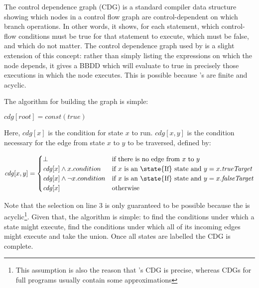 \label{sect:cdg}

The control dependence graph (CDG) is a standard compiler data
structure\needCite{} showing which nodes in a control flow graph are
control-dependent on which branch operations.  In other words, it
shows, for each statement, which control-flow conditions must be true
for that statement to execute, which must be false, and which do not
matter.  The control dependence graph used by {\technique} is a slight
extension of this concept: rather than simply listing the expressions
on which the node depends, it gives a BBDD which will evaluate to true
in precisely those executions in which the node executes.  This is
possible because {\technique}'s {\StateMachines} are finite and
acyclic.

The algorithm for building the graph is simple:

\begin{algorithmic}[1]
\State $\mathit{cdg}[\mathit{root}] = \mathit{const}(\mathit{true})$
\EndWhile
\end{algorithmic}

Here, $\mathit{cdg}[x]$ is the condition for state $x$ to run.
$\mathit{cdg}[x, y]$ is the condition necessary for the edge from
state $x$ to $y$ to be traversed, defined by:

\begin{displaymath}
\mathit{cdg}[x, y] = \begin{cases}
  \bot                                     & \text{if there is no edge from $x$ to $y$} \\
  \mathit{cdg}[x] \wedge x.condition       & \text{if $x$ is an \state{If} state and $y = x.\mathit{trueTarget}$} \\
  \mathit{cdg}[x] \wedge {\neg}x.condition & \text{if $x$ is an \state{If} state and $y = x.\mathit{falseTarget}$} \\
  \mathit{cdg}[x]                          & \text{otherwise}
\end{cases}
\end{displaymath}

Note that the selection on line 3 is only guaranteed to be possible
because the {\StateMachine} is acyclic\footnote{This assumption is
  also the reason that {\technique}'s CDG is precise, whereas CDGs for
  full programs usually contain some approximations}.  Given that, the
algorithm is simple: to find the conditions under which a state might
execute, find the conditions under which all of its incoming edges
might execute and take the union.  Once all states are labelled the
CDG is complete.

